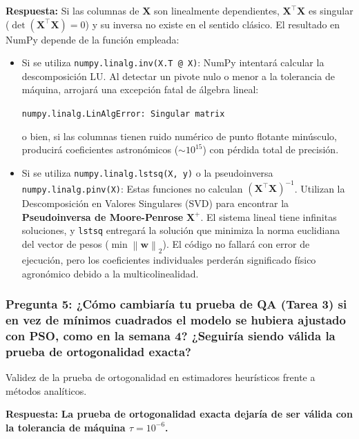 \documentclass[12pt,a4paper]{article}
\newcommand{\norm}[1]{\left\lVert #1\right\rVert}
\begin{document}
\textbf{Respuesta:}
Si las columnas de $\mathbf{X}$ son linealmente dependientes, $\mathbf{X}^\top \mathbf{X}$ es singular ($\det(\mathbf{X}^\top \mathbf{X}) = 0$) y su inversa no existe en el sentido clásico. El resultado en NumPy depende de la función empleada:
\begin{itemize}[label={\color{p3blue}$\blacktriangleright$}]
  \item Si se utiliza \texttt{numpy.linalg.inv(X.T @ X)}: NumPy intentará calcular la descomposición LU. Al detectar un pivote nulo o menor a la tolerancia de máquina, arrojará una excepción fatal de álgebra lineal:
  \begin{center}
    \texttt{numpy.linalg.LinAlgError: Singular matrix}
  \end{center}
  o bien, si las columnas tienen ruido numérico de punto flotante minúsculo, producirá coeficientes astronómicos ($\sim 10^{15}$) con pérdida total de precisión.
  \item Si se utiliza \texttt{numpy.linalg.lstsq(X, y)} o la pseudoinversa \texttt{numpy.linalg.pinv(X)}: Estas funciones no calculan $(\mathbf{X}^\top \mathbf{X})^{-1}$. Utilizan la Descomposición en Valores Singulares (SVD) para encontrar la \textbf{Pseudoinversa de Moore-Penrose} $\mathbf{X}^+$. El sistema lineal tiene infinitas soluciones, y \texttt{lstsq} entregará la solución que minimiza la norma euclidiana del vector de pesos ($\min \norm{\mathbf{w}}_2$). El código no fallará con error de ejecución, pero los coeficientes individuales perderán significado físico agronómico debido a la multicolinealidad.
\end{itemize}

\vspace{10pt}
\subsubsection*{Pregunta 5: ¿Cómo cambiaría tu prueba de QA (Tarea 3) si en vez de mínimos cuadrados el modelo se hubiera ajustado con PSO, como en la semana 4? ¿Seguiría siendo válida la prueba de ortogonalidad exacta?}
\begin{pthreeProblem}
Validez de la prueba de ortogonalidad en estimadores heurísticos frente a métodos analíticos.
\end{pthreeProblem}

\textbf{Respuesta:}
\textbf{La prueba de ortogonalidad exacta dejaría de ser válida con la tolerancia de máquina $\tau = 10^{-6}$.}
\end{document}
